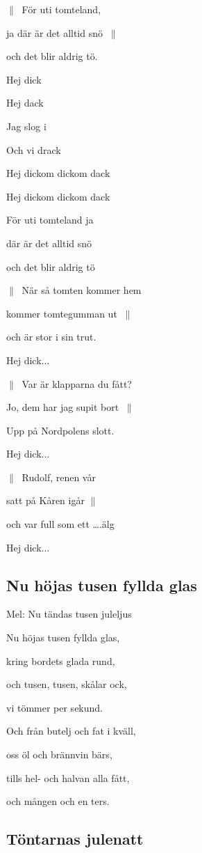 $\|\:$ För uti tomteland,

ja där är det alltid snö $\:\|$

och det blir aldrig tö.

Hej dick

Hej dack

Jag slog i

Och vi drack

Hej dickom dickom dack

Hej dickom dickom dack

För uti tomteland ja

där är det alltid snö

och det blir aldrig tö\bigskip

$\|\:$ När så tomten kommer hem

kommer tomtegumman ut $\:\|$

och är stor i sin trut.

Hej dick...\bigskip

$\|\:$ Var är klapparna du fått?

Jo, dem har jag supit bort $\:\|$

Upp på Nordpolens slott.

Hej dick...\bigskip

$\|\:$ Rudolf, renen vår

satt på Kåren igår $\|\:$

och var full som ett ….älg

Hej dick...\bigskip

\subsection{\textbf{Nu höjas tusen fyllda glas}}

Mel: Nu tändas tusen juleljus\bigskip

Nu höjas tusen fyllda glas,

kring bordets glada rund,

och tusen, tusen, skålar ock,

vi tömmer per sekund.\bigskip

Och från butelj och fat i kväll,

oss öl och brännvin bärs,

tills hel- och halvan alla fått,

och mången och en ters. 

\subsection{\textbf{Töntarnas julenatt}}

